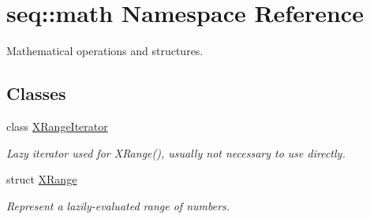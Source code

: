 \hypertarget{namespaceseq_1_1math}{\section{seq\-:\-:math Namespace Reference}
\label{namespaceseq_1_1math}
}


Mathematical operations and structures.  


\subsection*{Classes}
\begin{DoxyCompactItemize}
\item 
class \hyperlink{classseq_1_1math_1_1_x_range_iterator}{X\-Range\-Iterator}
\begin{DoxyCompactList}\small\item\em Lazy iterator used for X\-Range(), usually not necessary to use directly. \end{DoxyCompactList}\item 
struct \hyperlink{structseq_1_1math_1_1_x_range}{X\-Range}
\begin{DoxyCompactList}\small\item\em Represent a lazily-\/evaluated range of numbers. \end{DoxyCompactList}\end{DoxyCompactItemize}
